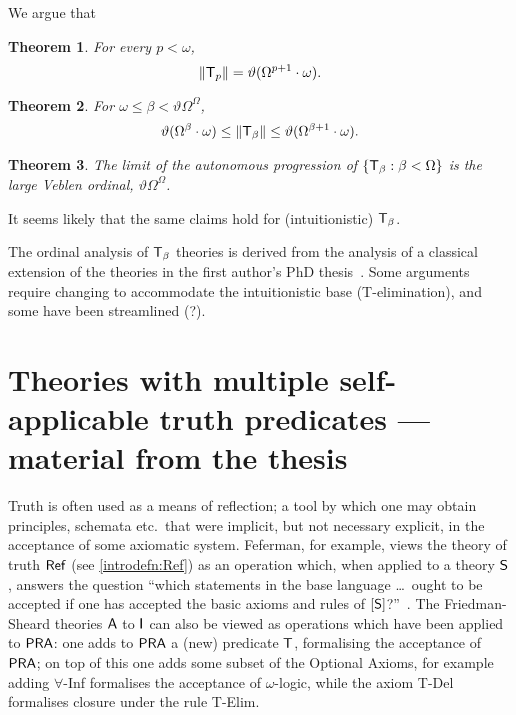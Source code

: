 \documentclass[UKenglish,cleveref,DIV=12]{scrartcl}
\newtheorem{theorem}{Theorem}
\theoremstyle{definition}
\theoremstyle{definition}
\begin{document}
We argue that
%
\begin{theorem}
	For every \( p < \omega \),
\[
  \lVert{\mathsf{T}_p}\rVert = \vartheta ( \Omega ^{p+1} \cdot \omega ).
\]
\end{theorem}

\begin{theorem}
	For \( \omega \le \beta < \vartheta \Omega^\Omega \),
\[
	\vartheta(\Omega^\beta \cdot \omega) \le \lVert{\mathsf{T}_\beta}\rVert \le \vartheta ( \Omega ^{\beta+1} \cdot \omega ).
\]
\end{theorem}

\begin{theorem}
	The limit of the autonomous progression of \( \{ \mathsf{T}_\beta : \beta < \Omega \} \) is the large Veblen ordinal, \( \vartheta \Omega^\Omega \).
\end{theorem}

It seems likely that the same claims hold for (intuitionistic) \( \mathsf{T}_\beta \).

The ordinal analysis of \( \mathsf{T}_\beta \) theories is derived from the analysis of a classical extension of the theories in the first author's PhD thesis~\cite{GEL-thesis}.
Some arguments require changing to accommodate the intuitionistic base (T-elimination), and some have been streamlined (?).

\section{Theories with multiple self-applicable truth predicates --- material from the thesis}
\label{chap:ext}

\fussy Truth is often used as a means of reflection; a tool by which one may obtain
principles, schemata etc.~that were implicit, but not necessary explicit, in the
acceptance of some axiomatic system. Feferman, for example, views the theory
of truth $\mathsf{Ref}$ (see \cref{introdefn:Ref}) as an operation which, when applied
to a theory $\mathsf{S}$, answers the question ``which statements in the base
language \dots{}\ {ought} to be accepted {if} one has accepted the basic axioms and
rules of $[\mathsf{S}]$?''~\cite[p.~2]{Fef91}.
The Friedman-Sheard theories $\mathsf{A}$ to $\mathsf{I}$ can also be viewed as operations which
have been applied to $\mathsf{PRA}$: one adds to $\mathsf{PRA}$ a (new) predicate $\mathsf{T}$,
formalising the acceptance of $\mathsf{PRA}$; on top of this one adds some subset of the Optional
Axioms, for example adding $\forall$-Inf formalises the acceptance of
$\omega$-logic, while the axiom T-Del formalises closure under the rule T-Elim.
\end{document}
